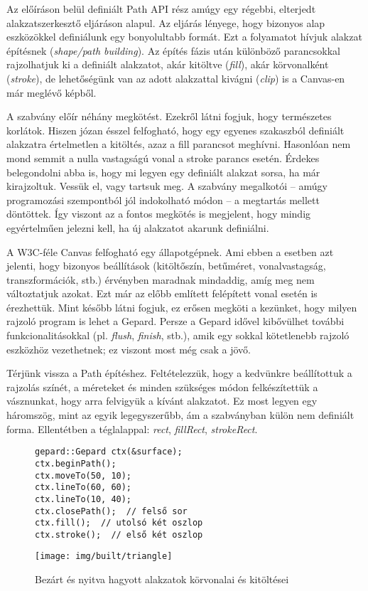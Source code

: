 \documentclass[12pt]{report}
\theoremstyle{definition}
\newcommand{\inenglish}[1]{\textsl{#1}}
\begin{document}
  Az előíráson belül definiált Path API rész amúgy egy régebbi, elterjedt
alakzatszerkesztő eljáráson alapul. Az eljárás lényege, hogy bizonyos alap
eszközökkel definiálunk egy bonyolultabb formát. Ezt a folyamatot hívjuk
alakzat építésnek (\inenglish{shape/path building}). Az építés fázis után
különböző parancsokkal rajzolhatjuk ki a definiált alakzatot, akár kitöltve
(\emph{fill}), akár körvonalként (\emph{stroke}), de lehetőségünk van az adott
alakzattal kivágni (\emph{clip}) is a Canvas-en már meglévő képből.

  A szabvány előír néhány megkötést. Ezekről látni fogjuk, hogy természetes
korlátok. Hiszen józan ésszel felfogható, hogy egy egyenes szakaszból definiált
alakzatra értelmetlen a kitöltés, azaz a fill parancsot meghívni. Hasonlóan nem
mond semmit a nulla vastagságú vonal a stroke parancs esetén. Érdekes
belegondolni abba is, hogy mi legyen egy definiált alakzat sorsa, ha már
kirajzoltuk. Vessük el, vagy tartsuk meg. A szabvány megalkotói -- amúgy
programozási szempontból jól indokolható módon -- a megtartás mellett
döntöttek. Így viszont az a fontos megkötés is megjelent, hogy mindig
egyértelműen jelezni kell, ha új alakzatot akarunk definiálni.

  A W3C-féle Canvas felfogható egy állapotgépnek. Ami ebben a esetben azt
jelenti, hogy bizonyos beállítások (kitöltőszín, betűméret, vonalvastagság,
transzformációk, stb.) érvényben maradnak mindaddig, amíg meg nem változtatjuk
azokat. Ezt már az előbb említett felépített vonal esetén is érezhettük. Mint
később látni fogjuk, ez erősen megköti a kezünket, hogy milyen rajzoló program
is lehet a Gepard. Persze a Gepard idővel kibővülhet további funkcionalitásokkal
(pl. \emph{flush}, \emph{finish}, stb.), amik egy sokkal kötetlenebb rajzoló
eszközhöz vezethetnek; ez viszont most még csak a jövő.

  Térjünk vissza a Path építéshez. Feltételezzük, hogy a kedvünkre beállítottuk
a rajzolás színét, a méreteket és minden szükséges módon felkészítettük a
vásznunkat, hogy arra felvigyük a kívánt alakzatot. Ez most legyen egy
háromszög, mint az egyik legegyszerűbb, ám a szabványban külön nem definiált
forma. Ellentétben a téglalappal: \emph{rect}, \emph{fillRect},
\emph{strokeRect}.

  \begin{figure}[!htb]
    \hspace{0.1\textwidth}
      \centering
      \begin{lstlisting}
gepard::Gepard ctx(&surface);
ctx.beginPath();
ctx.moveTo(50, 10);
ctx.lineTo(60, 60);
ctx.lineTo(10, 40);
ctx.closePath();  // felső sor
ctx.fill();  // utolsó két oszlop
ctx.stroke();  // első két oszlop
      \end{lstlisting}
    \endminipage
    \hfill
      \texttt{[image: img/built/triangle]}
    \endminipage
    \caption{\label{triangles-code-and-image} Bezárt és nyitva hagyott
    alakzatok körvonalai és kitöltései }
  \end{figure}
\end{document}
